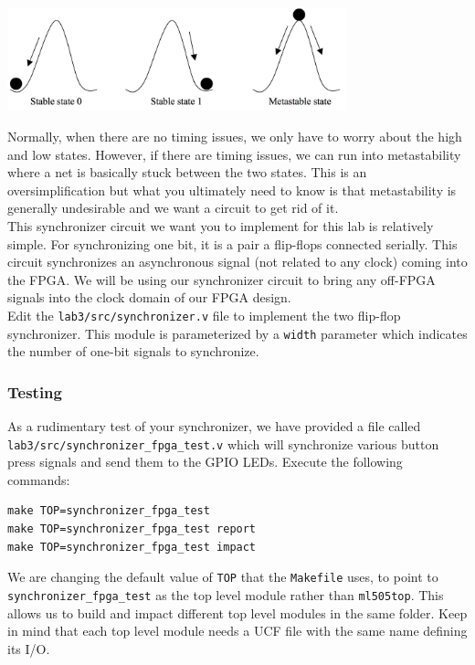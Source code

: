 \documentclass[11pt]{article}
\begin{document}
\begin{center}
\includegraphics[height=3cm]{images/lab2_fig3.png}
\end{center}

Normally, when there are no timing issues, we only have to worry about the high and low states. However, if there are timing issues, we can run into metastability where a net is basically stuck between the two states. This is an oversimplification but what you ultimately need to know is that metastability is generally undesirable and we want a circuit to get rid of it. \\

This synchronizer circuit we want you to implement for this lab is relatively simple. For synchronizing one bit, it is a pair a flip-flops connected serially. This circuit synchronizes an asynchronous signal (not related to any clock) coming into the FPGA. We will be using our synchronizer circuit to bring any off-FPGA signals into the clock domain of our FPGA design.\\

Edit the \verb|lab3/src/synchronizer.v| file to implement the two flip-flop synchronizer. This module is parameterized by a \verb|width| parameter which indicates the number of one-bit signals to synchronize.

\subsubsection{Testing}
As a rudimentary test of your synchronizer, we have provided a file called \verb|lab3/src/synchronizer_fpga_test.v| which will synchronize various button press signals and send them to the GPIO LEDs. Execute the following commands:

\begin{verbatim}
make TOP=synchronizer_fpga_test
make TOP=synchronizer_fpga_test report
make TOP=synchronizer_fpga_test impact
\end{verbatim} 

We are changing the default value of \verb|TOP| that the \verb|Makefile| uses, to point to \verb|synchronizer_fpga_test| as the top level module rather than \verb|ml505top|. This allows us to build and impact different top level modules in the same folder. Keep in mind that each top level module needs a UCF file with the same name defining its I/O.
\end{document}
